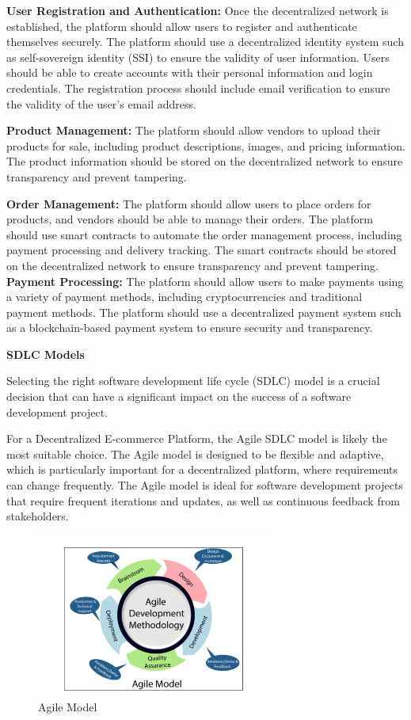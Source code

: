\documentclass{report}
\begin{document}
\textbf{User Registration and Authentication:}
Once the decentralized network is established, the platform should allow users to register and authenticate themselves securely. The platform should use a decentralized identity system such as self-sovereign identity (SSI) to ensure the validity of user information. Users should be able to create accounts with their personal information and login credentials. The registration process should include email verification to ensure the validity of the user's email address.

\textbf{Product Management:}
The platform should allow vendors to upload their products for sale, including product descriptions, images, and pricing information. The product information should be stored on the decentralized network to ensure transparency and prevent tampering.

\textbf{Order Management:}
The platform should allow users to place orders for products, and vendors should be able to manage their orders. The platform should use smart contracts to automate the order management process, including payment processing and delivery tracking. The smart contracts should be stored on the decentralized network to ensure transparency and prevent tampering.\\


\textbf{Payment Processing:}
The platform should allow users to make payments using a variety of payment methods, including cryptocurrencies and traditional payment methods. The platform should use a decentralized payment system such as a blockchain-based payment system to ensure security and transparency.


\vspace{1cm}

\textbf{SDLC Models}

Selecting the right software development life cycle (SDLC) model is a crucial decision that can have a significant impact on the success of a software development project.

For a Decentralized E-commerce Platform, the Agile SDLC model is likely the most suitable choice. The Agile model is designed to be flexible and adaptive, which is particularly important for a decentralized platform, where requirements can change frequently. The Agile model is ideal for software development projects that require frequent iterations and updates, as well as continuous feedback from stakeholders.

\begin{figure}[H]
    \centering
    \includegraphics[width=8cm]{model/Screenshot from 2023-05-15 19-51-13.png}
    \caption{Agile Model}
    \label{fig:enter-label}
\end{figure}
\end{document}
